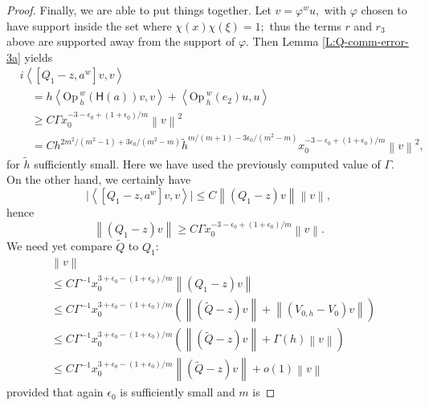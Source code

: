 \documentclass[twoside, final]{amsart}
\theoremstyle{definition}
\numberwithin{equation}{section}
\begin{document}
\begin{proof}
Finally, we are able to put things together.  
Let $v=\varphi^w u,$ with $\varphi$ chosen to have support inside the
set where $\chi(x)\chi(\xi)=1;$ thus the terms $r$ and $r_3$ above are supported
away from the support of $\varphi.$  Then
Lemma \ref{L:Q-comm-error-3a} yields
\begin{align*}
& i{{\left\langle{{[Q_1-z,a^w]v,v}}\right\rangle}}\\
& \quad =h{{\left\langle{{{\mathrm{Op}\,}_h^w({{\textsf{H}}}(a))v,v}}\right\rangle}}+{{\left\langle{{{\mathrm{Op}\,}_h^w(e_2)u,u}}\right\rangle}}
\\
&\quad {\geqslant} C \Gamma x_0^{ -3 -
  \epsilon_0 + (1 +
  \epsilon_0)/m  } {{\left\lVert{{v}}\right\rVert}}^2 \\
& \quad = 
C   h^{ 2m^2/(m^2-1) +  3 \epsilon_0 /(m^2-m)} {\tilde{h}}^{m/(m+1) - 3
  \epsilon_0 /(m^2-m)} x_0^{ -3 -
  \epsilon_0 + (1 +
  \epsilon_0)/m  }{{\left\lVert{{v}}\right\rVert}}^2,
\end{align*}
 for
${\tilde{h}}$ sufficiently small.  Here we have used the previously computed
value of $\Gamma$.  
On the other hand, we certainly have
$$
\big\lvert {{\left\langle{{[Q_1-z,a^w]v,v}}\right\rangle}}\big\rvert {\leqslant} C {{\left\lVert{{(Q_1-z)v}}\right\rVert}}{{\left\lVert{{v}}\right\rVert}},
$$
hence 
\[
{{\left\lVert{{(Q_1-z)v}}\right\rVert}} {\geqslant} C \Gamma x_0^{ -3 -
  \epsilon_0 + (1 +
  \epsilon_0)/m  } {{\left\lVert{{v}}\right\rVert}}.
\]
We need yet compare ${\widetilde{Q}}$ to $Q_1$:
\begin{align*}
& {{\left\lVert{{v}}\right\rVert}} \\
& {\leqslant} C \Gamma^{-1} x_0^{ 3 +
  \epsilon_0 - (1 +
  \epsilon_0)/m  } {{\left\lVert{{(Q_1-z)v}}\right\rVert}} \\
& {\leqslant} C \Gamma^{-1} x_0^{ 3 +
  \epsilon_0 - (1 +
  \epsilon_0)/m  } \left( {{\left\lVert{{({\widetilde{Q}} -z) v }}\right\rVert}} +
    {{\left\lVert{{(V_{0,h} - V_0 ) v }}\right\rVert}} \right) \\
& {\leqslant} C \Gamma^{-1} x_0^{ 3 +
  \epsilon_0 - (1 +
  \epsilon_0)/m  } \left( {{\left\lVert{{({\widetilde{Q}} -z) v }}\right\rVert}} +
     \Gamma(h) {{\left\lVert{{v }}\right\rVert}} \right) \\
& {\leqslant} C \Gamma^{-1} x_0^{ 3 +
  \epsilon_0 - (1 +
  \epsilon_0)/m  } {{\left\lVert{{({\widetilde{Q}} -z) v }}\right\rVert}} +
    o(1) {{\left\lVert{{v }}\right\rVert}} 
\end{align*}
provided that again $\epsilon_0$ is sufficiently small and $m$ is

\end{proof}
\end{document}
